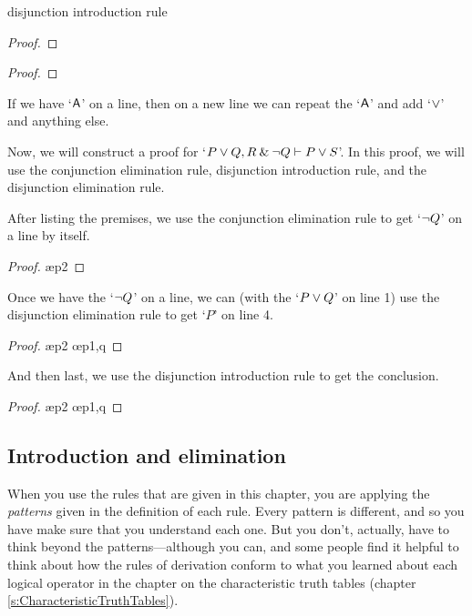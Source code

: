 \begin{factboxy}{disjunction introduction rule}
\begin{proof}
\end{proof}

\begin{proof}
\end{proof}

\small{If we have `$\mathsf{A}$' on a line, then on a new line we can repeat the `$\mathsf{A}$' and add `$\vee$' and anything else.}

\end{factboxy}
\bigskip

\noindent Now, we will construct a proof for `$P \vee Q, R \mathbin{\&} {\neg} Q \vdash P \vee S$'. In this proof, we will use the conjunction elimination rule, disjunction introduction rule, and the disjunction elimination rule.

After listing the premises, we use the conjunction elimination rule to get `${\neg} Q$' on a line by itself. 
\begin{proof}
	 \pr{}
	 \pr{}
	 \ae{p2}
\end{proof}
Once we have the `${\neg} Q$' on a line, we can (with the `$P \vee Q$' on line 1) use the disjunction elimination rule to get `$P$' on line 4.
\begin{proof}
	 \pr{}
	 \pr{}
	 \ae{p2}
	 \oe{p1,q}
\end{proof}
And then last, we use the disjunction introduction rule to get the conclusion.
\begin{proof}
	 \pr{}
	 \pr{}
	 \ae{p2}
	 \oe{p1,q}
	 
\end{proof}



\subsection{Introduction and elimination}
When you use the rules that are given in this chapter, you are applying the \textit{patterns} given in the definition of each rule. Every pattern is different, and so you have make sure that you understand each one. But you don't, actually, have to think beyond the patterns---although you can, and some people find it helpful to think about how the rules of derivation conform to what you learned about each logical operator in the chapter on the characteristic truth tables (chapter \ref{s:CharacteristicTruthTables}).

